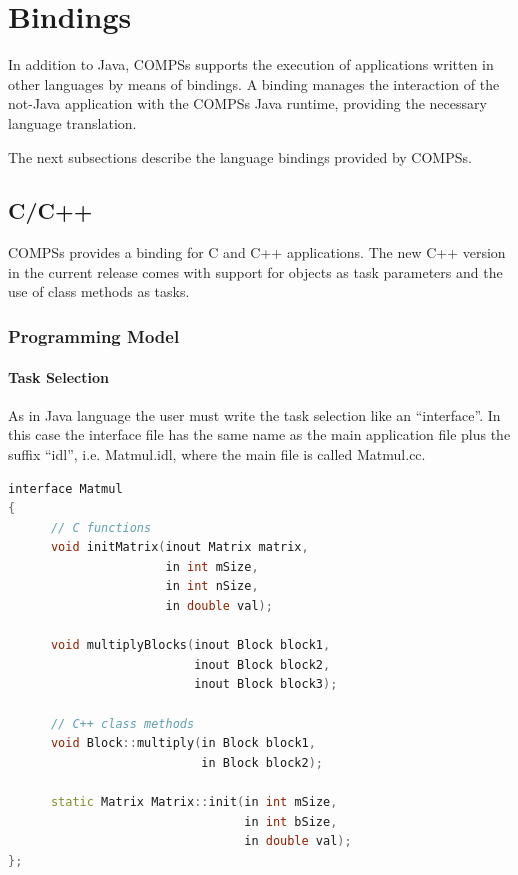 \section{Bindings}
\label{sec:Bindings}

In addition to Java, COMPSs supports the execution of applications written in other languages by 
means of bindings. A binding manages the interaction of the not-Java application with the COMPSs 
Java runtime, providing the necessary language translation.

The next subsections describe the language bindings provided by COMPSs.

\subsection{C/C++}

COMPSs provides a binding for C and C++ applications. The new C++ version in the current release 
comes with support for objects as task parameters and the use of class methods as tasks.

\subsubsection{Programming Model}

\paragraph{Task Selection}
As in Java language the user must write the task selection like an ``interface''. In this case 
the interface file has the same name as the main application file plus the suffix ``idl'', 
i.e. Matmul.idl, where the main file is called Matmul.cc.

\begin{lstlisting}[language=C++]
interface Matmul
{
      // C functions
      void initMatrix(inout Matrix matrix,
                      in int mSize,
                      in int nSize,
                      in double val);
                      
      void multiplyBlocks(inout Block block1,
                          inout Block block2,
                          inout Block block3);
                          
      // C++ class methods
      void Block::multiply(in Block block1,
                           in Block block2);
                           
      static Matrix Matrix::init(in int mSize,
                                 in int bSize,
                                 in double val);
};
\end{lstlisting}

